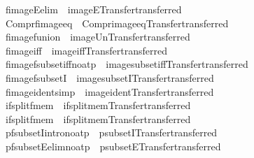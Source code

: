 \begin{isabellebody}
\isamarkupfalse%
\ fimageE{\isacharbrackleft}elim{\isacharbang}{\isacharbrackright}\ {\isacharequal}\ imageE{\isacharbrackleft}Transfer{\isachardot}transferred{\isacharbrackright}\isanewline
{}\isamarkupfalse%
\ Compr{\isacharunderscore}fimage{\isacharunderscore}eq\ {\isacharequal}\ Compr{\isacharunderscore}image{\isacharunderscore}eq{\isacharbrackleft}Transfer{\isachardot}transferred{\isacharbrackright}\isanewline
{}\isamarkupfalse%
\ fimage{\isacharunderscore}funion\ {\isacharequal}\ image{\isacharunderscore}Un{\isacharbrackleft}Transfer{\isachardot}transferred{\isacharbrackright}\isanewline
{}\isamarkupfalse%
\ fimage{\isacharunderscore}iff\ {\isacharequal}\ image{\isacharunderscore}iff{\isacharbrackleft}Transfer{\isachardot}transferred{\isacharbrackright}\isanewline
{}\isamarkupfalse%
\ fimage{\isacharunderscore}fsubset{\isacharunderscore}iff{\isacharbrackleft}no{\isacharunderscore}atp{\isacharbrackright}\ {\isacharequal}\ image{\isacharunderscore}subset{\isacharunderscore}iff{\isacharbrackleft}Transfer{\isachardot}transferred{\isacharbrackright}\isanewline
{}\isamarkupfalse%
\ fimage{\isacharunderscore}fsubsetI\ {\isacharequal}\ image{\isacharunderscore}subsetI{\isacharbrackleft}Transfer{\isachardot}transferred{\isacharbrackright}\isanewline
{}\isamarkupfalse%
\ fimage{\isacharunderscore}ident{\isacharbrackleft}simp{\isacharbrackright}\ {\isacharequal}\ image{\isacharunderscore}ident{\isacharbrackleft}Transfer{\isachardot}transferred{\isacharbrackright}\isanewline
{}\isamarkupfalse%
\ if{\isacharunderscore}split{\isacharunderscore}fmem{}\ {\isacharequal}\ if{\isacharunderscore}split{\isacharunderscore}mem{}{\isacharbrackleft}Transfer{\isachardot}transferred{\isacharbrackright}\isanewline
{}\isamarkupfalse%
\ if{\isacharunderscore}split{\isacharunderscore}fmem{}\ {\isacharequal}\ if{\isacharunderscore}split{\isacharunderscore}mem{}{\isacharbrackleft}Transfer{\isachardot}transferred{\isacharbrackright}\isanewline
{}\isamarkupfalse%
\ pfsubsetI{\isacharbrackleft}intro{\isacharbang}{\isacharcomma}no{\isacharunderscore}atp{\isacharbrackright}\ {\isacharequal}\ psubsetI{\isacharbrackleft}Transfer{\isachardot}transferred{\isacharbrackright}\isanewline
{}\isamarkupfalse%
\ pfsubsetE{\isacharbrackleft}elim{\isacharbang}{\isacharcomma}no{\isacharunderscore}atp{\isacharbrackright}\ {\isacharequal}\ psubsetE{\isacharbrackleft}Transfer{\isachardot}transferred{\isacharbrackright}\isanewline

\end{isabellebody}
